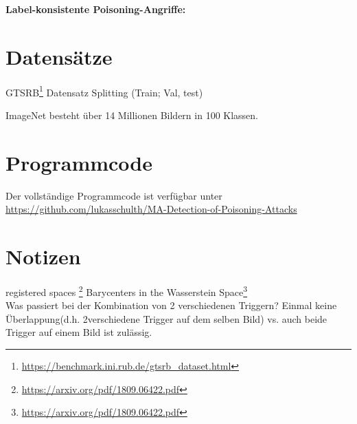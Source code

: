 \documentclass[11pt,a4paper]{article}
\numberwithin{equation}{section}
\begin{document}
	\textbf{Label-konsistente Poisoning-Angriffe:}
	\section{Datensätze}
	GTSRB\footnote{\url{https://benchmark.ini.rub.de/gtsrb_dataset.html}}
	Datensatz Splitting (Train; Val, test)
	
	ImageNet besteht über 14 Millionen Bildern in 100 Klassen.
	\section{Programmcode}
	Der vollständige Programmcode ist verfügbar unter \url{https://github.com/lukasschulth/MA-Detection-of-Poisoning-Attacks}
	
	
	\section{Notizen}
	registered spaces \footnote{\url{https://arxiv.org/pdf/1809.06422.pdf}}
	Barycenters in the Wasserstein Space\footnote{\url{https://arxiv.org/pdf/1809.06422.pdf}}\\
	Was passiert bei der Kombination von 2 verschiedenen Triggern? Einmal keine Überlappung(d.h. 2verschiedene Trigger auf dem selben Bild) vs. auch beide Trigger auf einem Bild ist zulässig.
	\newpage
	
	\printglossaries
	
	\newpage
	
	
	
	
	
	
	
\end{document}

